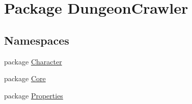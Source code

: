 \hypertarget{namespace_dungeon_crawler}{}\section{Package Dungeon\+Crawler}
\label{namespace_dungeon_crawler}
\subsection*{Namespaces}
\begin{DoxyCompactItemize}
\item 
package \hyperlink{namespace_dungeon_crawler_1_1_character}{Character}
\item 
package \hyperlink{namespace_dungeon_crawler_1_1_core}{Core}
\item 
package \hyperlink{namespace_dungeon_crawler_1_1_properties}{Properties}
\end{DoxyCompactItemize}
